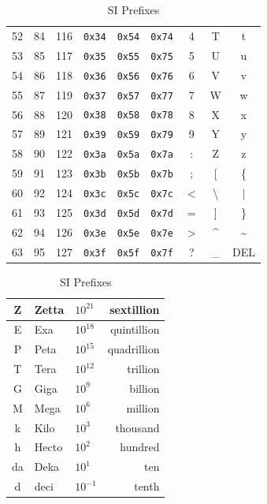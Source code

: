 \documentclass[12pt]{article}
\begin{document}
\begin{table}[H]
\begin{minipage}[t]{.55\linewidth}
\begin{tabular}{rrr | rrr | ccc}
	52 & 84 & 116	& \texttt{0x34} & \texttt{0x54} & \texttt{0x74}	& 4		& T 	& t\\
	53 & 85 & 117	& \texttt{0x35} & \texttt{0x55} & \texttt{0x75}	& 5		& U 	& u\\
	54 & 86 & 118	& \texttt{0x36} & \texttt{0x56} & \texttt{0x76} 	& 6		& V 	& v\\
	55 & 87 & 119	& \texttt{0x37} & \texttt{0x57} & \texttt{0x77}	& 7		& W 	& w\\
	56 & 88 & 120	& \texttt{0x38} & \texttt{0x58} & \texttt{0x78}	& 8		& X 	& x\\
	57 & 89 & 121 	& \texttt{0x39} & \texttt{0x59} & \texttt{0x79}	& 9		& Y 	& y\\
	58 & 90 & 122	& \texttt{0x3a} & \texttt{0x5a} & \texttt{0x7a}	& :		& Z	& z\\
	59 & 91 & 123	& \texttt{0x3b} & \texttt{0x5b} & \texttt{0x7b}	& ;		& [	& \{\\
	60 & 92 & 124	& \texttt{0x3c} & \texttt{0x5c} & \texttt{0x7c}	& $<$	& \textbackslash	& $\vert$\\
	61 & 93 & 125	& \texttt{0x3d} & \texttt{0x5d} & \texttt{0x7d}	& =		& ]	& \}\\
	62 & 94 & 126	& \texttt{0x3e} & \texttt{0x5e} & \texttt{0x7e}	& $>$	& \^{}	& \~{}\\
	63 & 95 & 127	& \texttt{0x3f} & \texttt{0x5f} & \texttt{0x7f}	& ?		& \_	& DEL\\
	\end{tabular}\end{minipage}\hfill
	\begin{minipage}[t]{.45\linewidth}
	\centering
	\caption{SI Prefixes \label{tab:SI PREFIXES}}
	\begin{tabular}{cllr}\hline
	Z 	& Zetta	& $10^{21}$	& sextillion\\\hline
	E 	& Exa		& $10^{18}$	& quintillion\\\hline
	P 	& Peta	& $10^{15}$	& quadrillion\\\hline
	T	& Tera	& $10^{12}$	& trillion\\\hline
	G	& Giga	& $10^{9}$		& billion\\\hline
	M	& Mega	& $10^{6}$		& million\\\hline
	k	& Kilo	& $10^{3}$		& thousand\\\hline
	h 	& Hecto	& $10^{2}$		& hundred\\\hline
	da	& Deka	& $10^{1}$		& ten\\\hline
	d 	& deci	& $10^{-1}$	& tenth\\\hline

\end{tabular}
\end{minipage}
\end{table}
\end{document}
